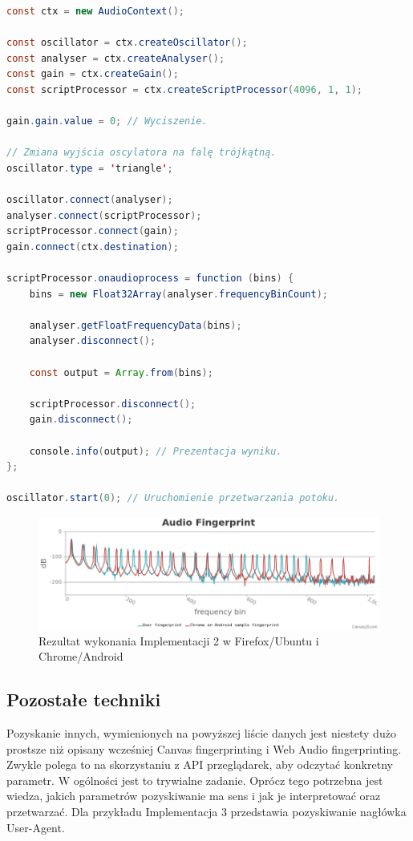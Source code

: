 \begin{lstlisting}[float,language=Java,caption=Podstawowy Web Audio fingerprinting w JavaScript]
const ctx = new AudioContext();

const oscillator = ctx.createOscillator();
const analyser = ctx.createAnalyser();
const gain = ctx.createGain();
const scriptProcessor = ctx.createScriptProcessor(4096, 1, 1);

gain.gain.value = 0; // Wyciszenie.

// Zmiana wyjścia oscylatora na falę trójkątną.
oscillator.type = 'triangle';

oscillator.connect(analyser);
analyser.connect(scriptProcessor);
scriptProcessor.connect(gain);
gain.connect(ctx.destination);

scriptProcessor.onaudioprocess = function (bins) {
    bins = new Float32Array(analyser.frequencyBinCount);

    analyser.getFloatFrequencyData(bins);
    analyser.disconnect();

    const output = Array.from(bins);

    scriptProcessor.disconnect();
    gain.disconnect();

    console.info(output); // Prezentacja wyniku.
};

oscillator.start(0); // Uruchomienie przetwarzania potoku.
\end{lstlisting}

\begin{figure}
	\includegraphics[width=\textwidth,keepaspectratio]{img/08}
	\caption{Rezultat wykonania Implementacji 2 w Firefox/Ubuntu i Chrome/Android}
\end{figure}

\subsection{Pozostałe techniki}
Pozyskanie innych, wymienionych na powyższej liście danych jest niestety dużo
prostsze niż opisany wcześniej Canvas fingerprinting i Web Audio fingerprinting.
Zwykle polega to na skorzystaniu z API przeglądarek, aby odczytać konkretny
parametr. W ogólności jest to trywialne zadanie. Oprócz tego potrzebna jest
wiedza, jakich parametrów pozyskiwanie ma sens i jak je interpretować oraz
przetwarzać. Dla przykładu Implementacja 3 przedstawia pozyskiwanie nagłówka
User-Agent.

